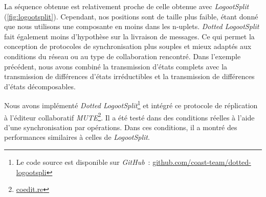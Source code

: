 La séquence obtenue est relativement proche de celle obtenue avec \emph{LogootSplit} (\autoref{fig:logootsplit}).
Cependant, nos positions sont de taille plus faible, étant donné que nous utilisons une composante en moins dans les n-uplets.
\emph{Dotted LogootSplit} fait également moins d'hypothèse sur la livraison de messages.
Ce qui permet la conception de protocoles de synchronisation plus souples et mieux adaptés aux conditions du réseau ou au type de collaboration rencontré.
Dans l'exemple précédent, nous avons combiné la transmission d'états complets avec la transmission de différences d'états irréductibles et la transmission de différences d'états décomposables.

Nous avons implémenté \emph{Dotted LogootSplit}\footnote{Le code source est disponible sur \emph{GitHub}~: \href{https://github.com/coast-team/dotted-logootsplit}{github.com/coast-team/dotted-logootspli}} et intégré ce protocole de réplication à l'éditeur collaboratif \emph{MUTE}\footnote{\href{https://coedit.re}{coedit.re}}.
Il a été testé dans des conditions réelles à l'aide d'une synchronisation par opérations.
Dans ces conditions, il a montré des performances similaires à celles de \emph{LogootSplit}.

\clearpage

